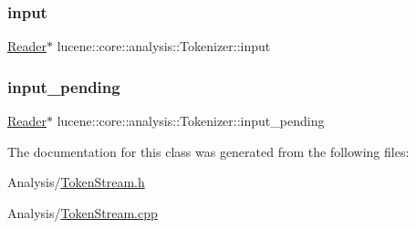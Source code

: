 \subsubsection{\texorpdfstring{input}{input}}
{\footnotesize\ttfamily \mbox{\hyperlink{classlucene_1_1core_1_1analysis_1_1Reader}{Reader}}$\ast$ lucene\+::core\+::analysis\+::\+Tokenizer\+::input\hspace{0.3cm}{\ttfamily [protected]}}

\mbox{\label{classlucene_1_1core_1_1analysis_1_1Tokenizer_ac968137c9d44ef57a69c8df4e6e628ff}} 
\subsubsection{\texorpdfstring{input\+\_\+pending}{input\_pending}}
{\footnotesize\ttfamily \mbox{\hyperlink{classlucene_1_1core_1_1analysis_1_1Reader}{Reader}}$\ast$ lucene\+::core\+::analysis\+::\+Tokenizer\+::input\+\_\+pending\hspace{0.3cm}{\ttfamily [protected]}}



The documentation for this class was generated from the following files\+:\begin{DoxyCompactItemize}
\item 
Analysis/\mbox{\hyperlink{TokenStream_8h}{Token\+Stream.\+h}}\item 
Analysis/\mbox{\hyperlink{TokenStream_8cpp}{Token\+Stream.\+cpp}}\end{DoxyCompactItemize}
